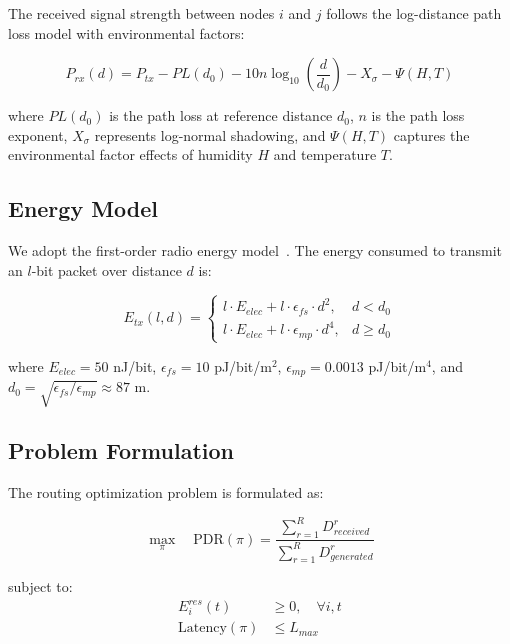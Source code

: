 \documentclass[sensors,article,submit,moreauthors,pdftex]{Definitions/mdpi}
\begin{document}
The received signal strength between nodes $i$ and $j$ follows the log-distance path loss model with environmental factors:

\begin{equation}
P_{rx}(d) = P_{tx} - PL(d_0) - 10n\log_{10}\left(\frac{d}{d_0}\right) - X_\sigma - \Psi(H, T)
\end{equation}

where $PL(d_0)$ is the path loss at reference distance $d_0$, $n$ is the path loss exponent, $X_\sigma$ represents log-normal shadowing, and $\Psi(H, T)$ captures the environmental factor effects of humidity $H$ and temperature $T$.

\subsection{Energy Model}

We adopt the first-order radio energy model~\cite{Heinzelman2000LEACH}. The energy consumed to transmit an $l$-bit packet over distance $d$ is:

\begin{equation}
E_{tx}(l, d) = \begin{cases}
l \cdot E_{elec} + l \cdot \epsilon_{fs} \cdot d^2, & d < d_0 \\
l \cdot E_{elec} + l \cdot \epsilon_{mp} \cdot d^4, & d \geq d_0
\end{cases}
\end{equation}

where $E_{elec} = 50$ nJ/bit, $\epsilon_{fs} = 10$ pJ/bit/m$^2$, $\epsilon_{mp} = 0.0013$ pJ/bit/m$^4$, and $d_0 = \sqrt{\epsilon_{fs}/\epsilon_{mp}} \approx 87$ m.

\subsection{Problem Formulation}

The routing optimization problem is formulated as:

\begin{equation}
\max_{\pi} \quad \text{PDR}(\pi) = \frac{\sum_{r=1}^{R} D_{received}^r}{\sum_{r=1}^{R} D_{generated}^r}
\end{equation}

subject to:
\begin{align}
E_i^{res}(t) &\geq 0, \quad \forall i, t \\
\text{Latency}(\pi) &\leq L_{max}
\end{align}
\end{document}
